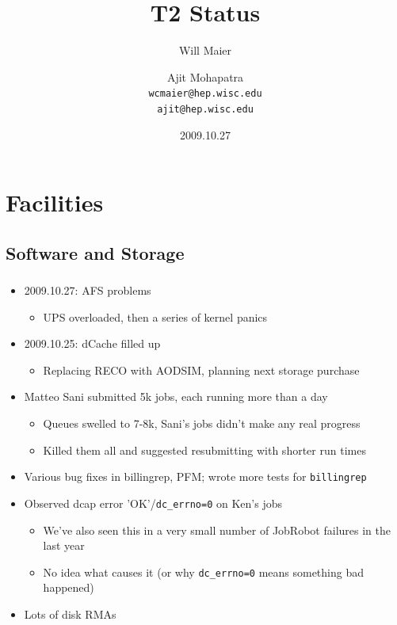 \documentclass{beamer}
\title{T2 Status}
\author[Maier, Mohapatra]{
    Will Maier \and Ajit Mohapatra\\ 
    {\tt wcmaier@hep.wisc.edu}\\
    {\tt ajit@hep.wisc.edu}}
\institute[Wisconsin]{University of Wisconsin - High Energy Physics}
\date{2009.10.27}
\begin{document}
\begin{frame}
    \titlepage
\end{frame}


\section{Facilities}
\subsection{Software and Storage}
\begin{frame}
\frametitle{}

\begin{itemize}
	\item 2009.10.27: AFS problems
	\begin{itemize}
		\item UPS overloaded, then a series of kernel panics
	\end{itemize}
	\item 2009.10.25: dCache filled up
	\begin{itemize}
		\item Replacing RECO with AODSIM, planning next storage purchase
	\end{itemize}
	\item Matteo Sani submitted 5k jobs, each running more than a day
	\begin{itemize}
		\item Queues swelled to 7-8k, Sani's jobs didn't make any real progress
		\item Killed them all and suggested resubmitting with shorter run times
	\end{itemize}
	\item Various bug fixes in billingrep, PFM; wrote more tests for {\tt billingrep}
	\item Observed dcap error 'OK'/{\tt dc\_errno=0} on Ken's jobs
	\begin{itemize}
		\item We've also seen this in a very small number of JobRobot failures in the last year
		\item No idea what causes it (or why {\tt dc\_errno=0} means something bad happened)
	\end{itemize}
	\item Lots of disk RMAs
\end{itemize}

\end{frame}
\end{document}
